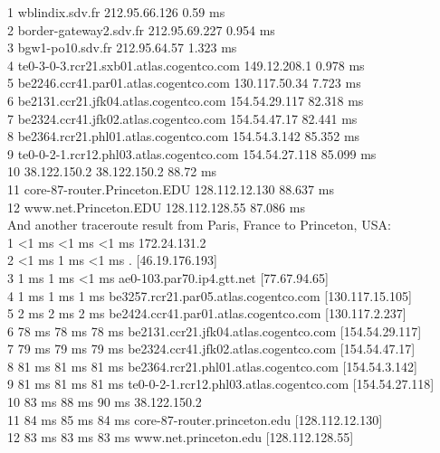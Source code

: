 \documentclass[paper=a4, fontsize=11pt]{scrartcl} %
\numberwithin{equation}{section} %
\numberwithin{figure}{section} %
\numberwithin{table}{section} %
\begin{document}
1	wblindix.sdv.fr      	212.95.66.126      	0.59 ms \\
2	border-gateway2.sdv.fr      	212.95.69.227      	0.954 ms \\
3	bgw1-po10.sdv.fr      	212.95.64.57      	1.323 ms \\
4	te0-3-0-3.rcr21.sxb01.atlas.cogentco.com      	149.12.208.1      	0.978 ms \\
5	be2246.ccr41.par01.atlas.cogentco.com      	130.117.50.34      	7.723 ms \\
6	be2131.ccr21.jfk04.atlas.cogentco.com      	154.54.29.117      	82.318 ms \\
7	be2324.ccr41.jfk02.atlas.cogentco.com      	154.54.47.17      	82.441 ms \\
8	be2364.rcr21.phl01.atlas.cogentco.com      	154.54.3.142      	85.352 ms \\
9	te0-0-2-1.rcr12.phl03.atlas.cogentco.com      	154.54.27.118      	85.099 ms \\
10	38.122.150.2      	38.122.150.2      	88.72 ms \\
11	core-87-router.Princeton.EDU      	128.112.12.130      	88.637 ms \\
12	www.net.Princeton.EDU      	128.112.128.55      	87.086 ms
\\

And another traceroute result from Paris, France to Princeton, USA: \\

1    <1 ms    <1 ms    <1 ms  172.24.131.2 \\
2    <1 ms     1 ms    <1 ms  . [46.19.176.193] \\
3     1 ms     1 ms    <1 ms  ae0-103.par70.ip4.gtt.net [77.67.94.65] \\
4     1 ms     1 ms     1 ms  be3257.rcr21.par05.atlas.cogentco.com [130.117.15.105] \\
5     2 ms     2 ms     2 ms  be2424.ccr41.par01.atlas.cogentco.com [130.117.2.237] \\
6    78 ms    78 ms    78 ms  be2131.ccr21.jfk04.atlas.cogentco.com [154.54.29.117] \\
7    79 ms    79 ms    79 ms  be2324.ccr41.jfk02.atlas.cogentco.com [154.54.47.17] \\
8    81 ms    81 ms    81 ms  be2364.rcr21.phl01.atlas.cogentco.com [154.54.3.142] \\
9    81 ms    81 ms    81 ms  te0-0-2-1.rcr12.phl03.atlas.cogentco.com [154.54.27.118] \\
10    83 ms    88 ms    90 ms  38.122.150.2 \\
11    84 ms    85 ms    84 ms  core-87-router.princeton.edu [128.112.12.130] \\
12    83 ms    83 ms    83 ms  www.net.princeton.edu [128.112.128.55] 
\\
\end{document}
